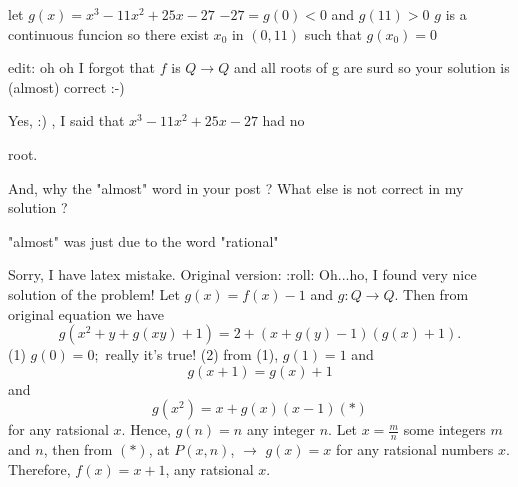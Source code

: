 \begin{solution}
	\begin{tcolorbox}let $ g(x) = x^3 - 11x^2 + 25x - 27$
$ - 27 = g(0) < 0$
and
$ g(11) > 0$
$ g$ is a continuous funcion so there exist $ x_0$ in $ (0,11)$ such that $ g(x_0) = 0$

edit: oh oh I forgot that  $ f$ is $ Q\to Q$  and all roots of g are surd so your solution is (almost) correct :-)\end{tcolorbox}

Yes,  :) , I said that $ x^3 - 11x^2 + 25x - 27$ had no root.

And, why the "almost" word in your post ?
What else is not correct in my solution ?
\end{solution}



\begin{solution}
	"almost" was just due to the word "rational"  
\end{solution}






\begin{solution}
	Sorry, I have latex mistake. Original version:  
 :roll: 
Oh...ho, I  found very nice solution of the problem!
Let  $g(x)=f(x)-1$  and  $ g:Q\rightarrow Q $.  Then from original equation  we have \[ g(x^2+y+g(xy)+1)=2+(x+g(y)-1)(g(x)+1) .\]
(1) $g(0)=0; $  really it's true!
(2)  from (1),  $ g(1)=1 $  and 
\[ g(x+1)=g(x)+1 \] and \[ g(x^2)=x+g(x)(x-1) (*)\]
for any ratsional $x$.
Hence, $ g(n)=n $ any integer $n$.    Let $x= $ some integers $m$ and $n$,  then from $(*)$, at $P(x,n)$, $\rightarrow $ $g(x)=x $ for any ratsional numbers $x$.
Therefore, $f(x)=x+1$, any ratsional $x$.
\end{solution}



